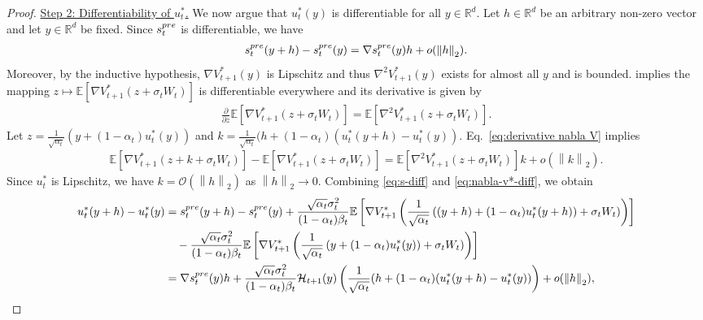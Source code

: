 \documentclass[10pt,a4paper]{amsart}
\newcommand{\R}{\mathbb{R}}
\newcommand{\bracket}[1]{\left[ #1 \right]}
\newcommand{\parenthesis}[1]{\left( #1 \right)}
\newcommand{\mcal}[1]{\mathcal{#1}}
\newcommand{\norm}[1]{\left \|#1\right \|}
\newcommand{\E}{\mathbb{E}}
\begin{document}
\begin{proof}
%
%
%
%

%
%
%
%
%
%
%
%
%
%

\underline{Step 2: Differentiability of $ u_{t}^{*} $.} We now argue that $ u_t^*(y)$ is differentiable for all $y\in \mathbb{R}^d$. Let $h \in \R^d$ be an arbitrary non-zero vector and let $y \in \R^d$ be fixed. Since $s_t^{\rm pre}$ is differentiable, we have
\begin{align}
    s_t^{\rm pre}(y + h) - s_t^{\rm pre}(y) = \nabla s_t^{\rm pre}(y) h + o(\norm{h}_2). \label{eq:s-diff}
\end{align}
Moreover, by the inductive hypothesis, $\nabla V_{t+1}^*(y)$ is Lipschitz and thus $\nabla^2 V_{t+1}^*(y)$ exists for almost all $y$ and is bounded. \cite[Theorem 2.27]{folland1999real} implies the mapping $z \mapsto \E\bracket{\nabla V^{*}_{t+1}(z + \sigma_t W_t)}$ is differentiable everywhere and its derivative is given by
\begin{align}\label{eq:derivative nabla V}
    \frac{\partial}{\partial z}\E\bracket{\nabla V^{*}_{t+1}(z + \sigma_t W_t)} = \E\bracket{\nabla^2 V^{*}_{t+1}(z + \sigma_t W_t)}. 
\end{align}
Let $z = \frac{1}{\sqrt{\alpha_t}}\parenthesis{y + (1 - \alpha_t)u_t^*(y)} $ and $k = \frac{1}{\sqrt{\alpha_t}}(h + (1 - \alpha_t)(u_t^{*}(y+h) - u_t^{*}(y))$. Eq.~\eqref{eq:derivative nabla V} implies
\begin{align}
    \E\bracket{\nabla V^{*}_{t+1}(z + k + \sigma_t W_t)} - \E\bracket{\nabla V^{*}_{t+1}(z + \sigma_t W_t)} = \E\bracket{\nabla^2 V_{t+1}^*(z + \sigma_t W_t)}k + o(\norm{k}_2). \label{eq:nabla-v*-diff}
\end{align}
Since $u_t^*$ is Lipschitz, we have $k = \mcal{O}(\norm{h}_2)$ as $\norm{h}_2 \to 0$. Combining \eqref{eq:s-diff} and \eqref{eq:nabla-v*-diff}, we obtain
\begin{align*}
    u_t^*(y+h) - u_t^*(y) & = s_{t}^{\rm pre}(y+h) - s_{t}^{\rm pre}(y)  + \frac{\sqrt{\alpha_{t}}\sigma_{t}^{2}}{(1 - \alpha_{t})\beta_t}\E\bracket{\nabla V_{t+1}^{*}\parenthesis{\frac{1}{\sqrt{\alpha_t}}\parenthesis{(y+h) + (1 - \alpha_t)u_t^*(y+h)} + \sigma_t W_t)}} \\ & \quad - \frac{\sqrt{\alpha_{t}}\sigma_{t}^{2}}{(1 - \alpha_{t})\beta_t}\E\bracket{\nabla V_{t+1}^{*}\parenthesis{\frac{1}{\sqrt{\alpha_t}}\parenthesis{y + (1 - \alpha_t)u_t^*(y)} + \sigma_t W_t)}} \\ & = \nabla s_t^{\rm pre}(y) h  + \frac{\sqrt{\alpha_{t}}\sigma_{t}^{2}}{(1 - \alpha_{t})\beta_t}\mcal{H}_{t+1}(y)\parenthesis{\frac{1}{\sqrt{\alpha_t}}(h + (1 - \alpha_t)(u_t^{*}(y+h) - u_t^{*}(y))} + o(\norm{h}_2),

\end{align*}
\end{proof}
\end{document}
